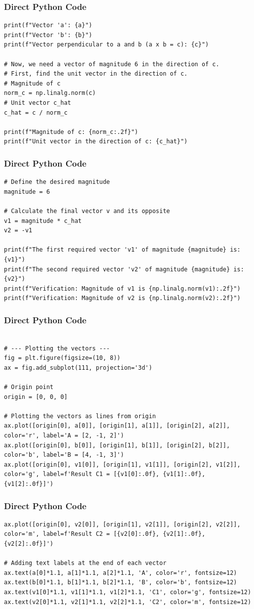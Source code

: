\documentclass{beamer}
\begin{document}
\begin{frame}[fragile]
\frametitle{Direct Python Code}
\begin{lstlisting}
print(f"Vector 'a': {a}")
print(f"Vector 'b': {b}")
print(f"Vector perpendicular to a and b (a x b = c): {c}")

# Now, we need a vector of magnitude 6 in the direction of c.
# First, find the unit vector in the direction of c.
# Magnitude of c
norm_c = np.linalg.norm(c)
# Unit vector c_hat
c_hat = c / norm_c

print(f"Magnitude of c: {norm_c:.2f}")
print(f"Unit vector in the direction of c: {c_hat}")
\end{lstlisting}
\end{frame}

\begin{frame}[fragile]
\frametitle{Direct Python Code}
\begin{lstlisting}
# Define the desired magnitude
magnitude = 6

# Calculate the final vector v and its opposite
v1 = magnitude * c_hat
v2 = -v1

print(f"The first required vector 'v1' of magnitude {magnitude} is: {v1}")
print(f"The second required vector 'v2' of magnitude {magnitude} is: {v2}")
print(f"Verification: Magnitude of v1 is {np.linalg.norm(v1):.2f}")
print(f"Verification: Magnitude of v2 is {np.linalg.norm(v2):.2f}")
\end{lstlisting}
\end{frame}

\begin{frame}[fragile]
\frametitle{Direct Python Code}
\begin{lstlisting}

# --- Plotting the vectors ---
fig = plt.figure(figsize=(10, 8))
ax = fig.add_subplot(111, projection='3d')

# Origin point
origin = [0, 0, 0]

# Plotting the vectors as lines from origin
ax.plot([origin[0], a[0]], [origin[1], a[1]], [origin[2], a[2]], color='r', label='A = [2, -1, 2]')
ax.plot([origin[0], b[0]], [origin[1], b[1]], [origin[2], b[2]], color='b', label='B = [4, -1, 3]')
ax.plot([origin[0], v1[0]], [origin[1], v1[1]], [origin[2], v1[2]], color='g', label=f'Result C1 = [{v1[0]:.0f}, {v1[1]:.0f}, {v1[2]:.0f}]')
\end{lstlisting}
\end{frame}

\begin{frame}[fragile]
\frametitle{Direct Python Code}
\begin{lstlisting}
ax.plot([origin[0], v2[0]], [origin[1], v2[1]], [origin[2], v2[2]], color='m', label=f'Result C2 = [{v2[0]:.0f}, {v2[1]:.0f}, {v2[2]:.0f}]')

# Adding text labels at the end of each vector
ax.text(a[0]*1.1, a[1]*1.1, a[2]*1.1, 'A', color='r', fontsize=12)
ax.text(b[0]*1.1, b[1]*1.1, b[2]*1.1, 'B', color='b', fontsize=12)
ax.text(v1[0]*1.1, v1[1]*1.1, v1[2]*1.1, 'C1', color='g', fontsize=12)
ax.text(v2[0]*1.1, v2[1]*1.1, v2[2]*1.1, 'C2', color='m', fontsize=12)

\end{lstlisting}
\end{frame}
\end{document}
